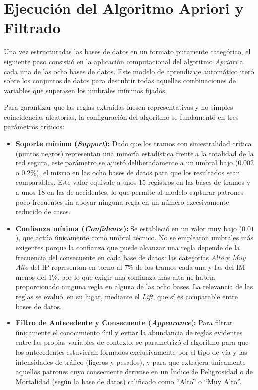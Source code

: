\documentclass[twoside,a4paper,12pt,onecolumn,openany]{book}
\begin{document}
\section{Ejecución del Algoritmo Apriori y Filtrado}

Una vez estructuradas las bases de datos en un formato puramente categórico, el siguiente paso consistió en la aplicación computacional del algoritmo \textit{Apriori} a cada una de las ocho bases de datos. Este modelo de aprendizaje automático iteró sobre los conjuntos de datos para descubrir todas aquellas combinaciones de variables que superasen los umbrales mínimos fijados.

\vspace{0.5cm}

Para garantizar que las reglas extraídas fuesen representativas y no simples coincidencias aleatorias, la configuración del algoritmo se fundamentó en tres parámetros críticos:
\begin{itemize}
    
    \item \textbf{Soporte mínimo (\textit{Support}):} Dado que los tramos con siniestralidad crítica (puntos negros) representan una minoría estadística frente a la totalidad de la red segura, este parámetro se ajustó deliberadamente a un umbral bajo ($0.002$ o $0.2\%$), el mismo en las ocho bases de datos para que los resultados sean comparables. Este valor equivale a unos 15 registros en las bases de tramos y a unos 18 en las de accidentes, lo que permite al modelo capturar patrones poco frecuentes sin apoyar ninguna regla en un número excesivamente reducido de casos.
    
    \item \textbf{Confianza mínima (\textit{Confidence}):} Se estableció en un valor muy bajo ($0.01$), que actúa únicamente como umbral técnico. No se emplearon umbrales más exigentes porque la confianza que puede alcanzar una regla depende de la frecuencia del consecuente en cada base de datos: las categorías \textit{Alto} y \textit{Muy Alto} del IP representan en torno al $7\%$ de los tramos cada una y las del IM menos del $1\%$, por lo que exigir una confianza más alta no habría proporcionado ninguna regla en alguna de las ocho bases. La relevancia de las reglas se evaluó, en su lugar, mediante el \textit{Lift}, que sí es comparable entre bases de datos.
    
    \item \textbf{Filtro de Antecedente y Consecuente (\textit{Appearance}):} Para filtrar únicamente el conocimiento útil y evitar la abundancia de reglas evidentes entre las propias variables de contexto, se parametrizó el algoritmo para que los antecedentes estuvieran formados exclusivamente por el tipo de vía y las intensidades de tráfico (ligeros y pesados), y para que extrajera únicamente aquellos patrones cuyo consecuente derivase en un Índice de Peligrosidad o de Mortalidad (según la base de datos) calificado como ``Alto'' o ``Muy Alto''.

\end{itemize}
\end{document}
